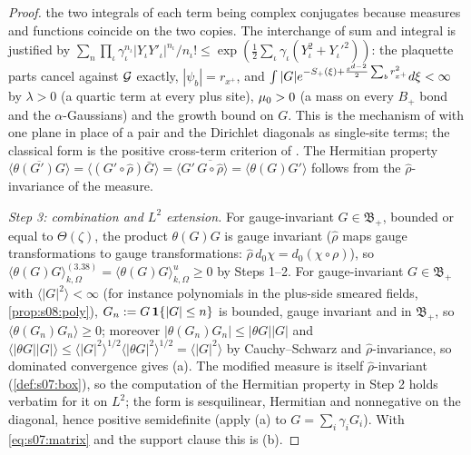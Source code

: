 \begin{proof}
the two integrals of each term being complex conjugates because measures and functions coincide on the two copies. The interchange of sum and integral is justified by $\sum_n\prod_\iota\gamma_\iota^{n_\iota}|Y_\iota Y'_\iota|^{n_\iota}/n_\iota!\le\exp(\frac12\sum_\iota\gamma_\iota(Y_\iota^2+Y_\iota'^2))$: the plaquette parts cancel against $\mathcal G$ exactly, $|\psi_b|=r_{x^+}$, and $\int|G|e^{-S_+(\xi)+\frac{\varepsilon^{d-2}}2\sum_br_{x^+}^2}d\xi<\infty$ by $\lambda>0$ (a quartic term at every plus site), $\mu_0>0$ (a mass on every $B_+$ bond and the $\alpha$-Gaussians) and the growth bound on $G$. This is the mechanism of \cite[Lemma~7.8(ii)]{SymPhase} with one plane in place of a pair and the Dirichlet diagonals as single-site terms; the classical form is the positive cross-term criterion of \cite{GJ,FILS78}. The Hermitian property $\overline{\langle\theta(G')G\rangle}=\langle(G'\circ\hat\rho)\bar G\rangle=\langle G'\,\overline{G\circ\hat\rho}\rangle=\langle\theta(G)G'\rangle$ follows from the $\hat\rho$-invariance of the measure.

\emph{Step 3: combination and $L^2$ extension.} For gauge-invariant $G\in\mathfrak B_+$, bounded or equal to $\Theta(\zeta)$, the product $\theta(G)G$ is gauge invariant ($\hat\rho$ maps gauge transformations to gauge transformations: $\hat\rho\,d_0\chi=d_0(\chi\circ\rho)$), so $\langle\theta(G)G\rangle^{(3.38)}_{k,\Omega}=\langle\theta(G)G\rangle^u_{k,\Omega}\ge0$ by Steps 1--2. For gauge-invariant $G\in\mathfrak B_+$ with $\langle|G|^2\rangle<\infty$ (for instance polynomials in the plus-side smeared fields, \cref{prop:s08:poly}), $G_n:= G\,\mathbf 1\{|G|\le n\}$ is bounded, gauge invariant and in $\mathfrak B_+$, so $\langle\theta(G_n)G_n\rangle\ge0$; moreover $|\theta(G_n)G_n|\le|\theta G||G|$ and $\langle|\theta G||G|\rangle\le\langle|G|^2\rangle^{1/2}\langle|\theta G|^2\rangle^{1/2}=\langle|G|^2\rangle$ by Cauchy--Schwarz and $\hat\rho$-invariance, so dominated convergence gives (a). The modified measure is itself $\hat\rho$-invariant (\cref{def:s07:box}), so the computation of the Hermitian property in Step 2 holds verbatim for it on $L^2$; the form is sesquilinear, Hermitian and nonnegative on the diagonal, hence positive semidefinite (apply (a) to $G=\sum_i\gamma_iG_i$). With \eqref{eq:s07:matrix} and the support clause this is (b).
\end{proof}

